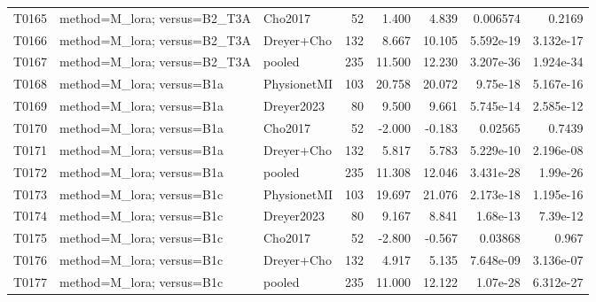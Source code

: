 \begin{longtable}{p{.45in}p{2.6in}p{.75in}rrrrr}
T0165 & method=M\_\allowbreak{}lora; versus=B2\_\allowbreak{}T3A & Cho2017 & 52 & 1.400 & 4.839 & 0.006574 & 0.2169 \\
T0166 & method=M\_\allowbreak{}lora; versus=B2\_\allowbreak{}T3A & Dreyer+Cho & 132 & 8.667 & 10.105 & 5.592e-19 & 3.132e-17 \\
T0167 & method=M\_\allowbreak{}lora; versus=B2\_\allowbreak{}T3A & pooled & 235 & 11.500 & 12.230 & 3.207e-36 & 1.924e-34 \\
T0168 & method=M\_\allowbreak{}lora; versus=B1a & PhysionetMI & 103 & 20.758 & 20.072 & 9.75e-18 & 5.167e-16 \\
T0169 & method=M\_\allowbreak{}lora; versus=B1a & Dreyer2023 & 80 & 9.500 & 9.661 & 5.745e-14 & 2.585e-12 \\
T0170 & method=M\_\allowbreak{}lora; versus=B1a & Cho2017 & 52 & -2.000 & -0.183 & 0.02565 & 0.7439 \\
T0171 & method=M\_\allowbreak{}lora; versus=B1a & Dreyer+Cho & 132 & 5.817 & 5.783 & 5.229e-10 & 2.196e-08 \\
T0172 & method=M\_\allowbreak{}lora; versus=B1a & pooled & 235 & 11.308 & 12.046 & 3.431e-28 & 1.99e-26 \\
T0173 & method=M\_\allowbreak{}lora; versus=B1c & PhysionetMI & 103 & 19.697 & 21.076 & 2.173e-18 & 1.195e-16 \\
T0174 & method=M\_\allowbreak{}lora; versus=B1c & Dreyer2023 & 80 & 9.167 & 8.841 & 1.68e-13 & 7.39e-12 \\
T0175 & method=M\_\allowbreak{}lora; versus=B1c & Cho2017 & 52 & -2.800 & -0.567 & 0.03868 & 0.967 \\
T0176 & method=M\_\allowbreak{}lora; versus=B1c & Dreyer+Cho & 132 & 4.917 & 5.135 & 7.648e-09 & 3.136e-07 \\
T0177 & method=M\_\allowbreak{}lora; versus=B1c & pooled & 235 & 11.000 & 12.122 & 1.07e-28 & 6.312e-27 \\
\bottomrule
\end{longtable}
